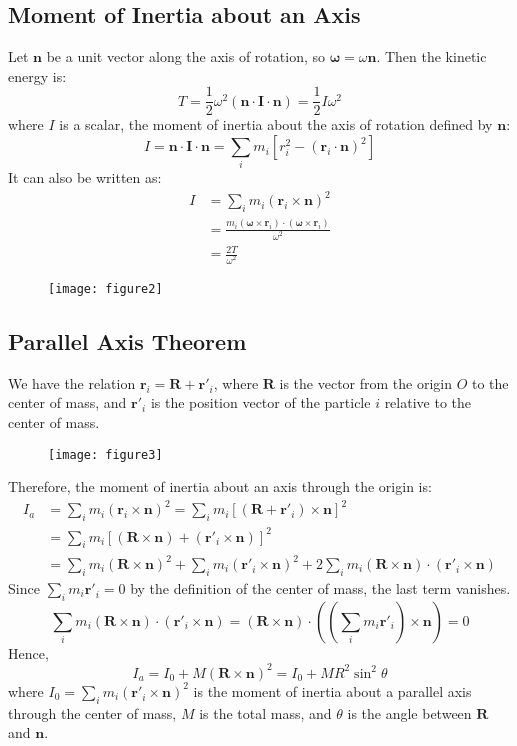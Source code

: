 \documentclass[12pt]{article}
\renewcommand{\vec}[1]{\mathbf{#1}}
\begin{document}
	\subsection{Moment of Inertia about an Axis}
	Let $\vec{n}$ be a unit vector along the axis of rotation, so $\vec{\omega} = \omega \vec{n}$. Then the kinetic energy is:
	\[
	T = \frac{1}{2} \omega^2 (\vec{n} \cdot \mathbf{I} \cdot \vec{n}) = \frac{1}{2} I \omega^2
	\]
	where $I$ is a scalar, the moment of inertia about the axis of rotation defined by $\vec{n}$:
	\[
	I = \vec{n} \cdot \mathbf{I} \cdot \vec{n} = \sum_i m_i [r_i^2 - (\vec{r}_i \cdot \vec{n})^2]
	\]
	It can also be written as:
	\begin{align*}
		I &= \sum_i m_i (\vec{r}_i \times \vec{n})^2 \\
		&= \frac{m_i (\vec{\omega} \times \vec{r}_i) \cdot (\vec{\omega} \times \vec{r}_i)}{\omega^2} \\
		&= \frac{2T}{\omega^2}
	\end{align*}
	
	\begin{figure}[h]
		\centering
		\texttt{[image: figure2]}
		\caption{}
		\label{fig:figure2}
	\end{figure}

	\subsection{Parallel Axis Theorem}
	We have the relation $\vec{r}_i = \vec{R} + \vec{r'}_i$, where $\vec{R}$ is the vector from the origin $O$ to the center of mass, and $\vec{r'}_i$ is the position vector of the particle $i$ relative to the center of mass.
	
	\begin{figure}[h]
		\centering
		\texttt{[image: figure3]}
		\caption{}
		\label{fig:figure3}
	\end{figure}
	
	Therefore, the moment of inertia about an axis through the origin is:
	\begin{align*}
		I_a &= \sum_i m_i (\vec{r}_i \times \vec{n})^2 = \sum_i m_i [(\vec{R} + \vec{r'}_i) \times \vec{n}]^2 \\
		&= \sum_i m_i [(\vec{R} \times \vec{n}) + (\vec{r'}_i \times \vec{n})]^2 \\
		&= \sum_i m_i (\vec{R} \times \vec{n})^2 + \sum_i m_i (\vec{r'}_i \times \vec{n})^2 + 2 \sum_i m_i (\vec{R} \times \vec{n}) \cdot (\vec{r'}_i \times \vec{n})
	\end{align*}
	Since $\sum_i m_i \vec{r'}_i = 0$ by the definition of the center of mass, the last term vanishes.
	\[
	\sum_i m_i (\vec{R} \times \vec{n}) \cdot (\vec{r'}_i \times \vec{n}) = (\vec{R} \times \vec{n}) \cdot \left( \left(\sum_i m_i \vec{r'}_i \right) \times \vec{n} \right) = 0
	\]
	Hence,
	\[
	I_a = I_0 + M(\vec{R} \times \vec{n})^2 = I_0 + MR^2\sin^2\theta
	\]
	where $I_0 = \sum_i m_i (\vec{r'}_i \times \vec{n})^2$ is the moment of inertia about a parallel axis through the center of mass, $M$ is the total mass, and $\theta$ is the angle between $\vec{R}$ and $\vec{n}$.
	
\end{document}
